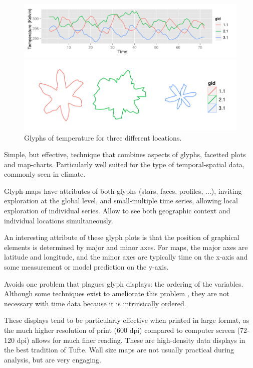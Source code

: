 \documentclass[oneside]{article}
\begin{document}
\begin{figure}[htp]
\centerline{\includegraphics[width=6in]{nasa-glyph-ts.pdf}}
\centerline{\includegraphics[width=6in]{nasa-glyph.pdf}}
\caption{Glyphs of temperature for three different locations.}
\label{fig:glyphs}
\end{figure}



Simple, but effective, technique that combines aspects of glyphs, facetted plots and map-charts. Particularly well suited for the type of temporal-spatial data, commonly seen in climate.

Glyph-maps have attributes of both glyphs (stars, faces, profiles, ...), inviting exploration at the global level, and small-multiple time series, allowing local exploration of individual series. Allow to see both geographic context and individual locations simultaneously.

An interesting attribute of these glyph plots is that the position of graphical elements is determined by major and minor axes. For maps, the major axes are latitude and longitude, and the minor axes are typically time on the x-axis and some measurement or model prediction on the y-axis.

Avoids one problem that plagues glyph displays: the ordering of the variables. Although some techniques exist to ameliorate this problem \citep{kleiner:1981,hurley:2010}, they are not necessary with time data because it is intrinsically ordered.

These displays tend to be particularly effective when printed in large format, as the much higher resolution of print (600 dpi) compared to computer  screen (72-120 dpi) allows for much finer reading. These are high-density data displays in the best tradition of Tufte. Wall size maps are not usually practical during analysis, but are very engaging.
\end{document}
